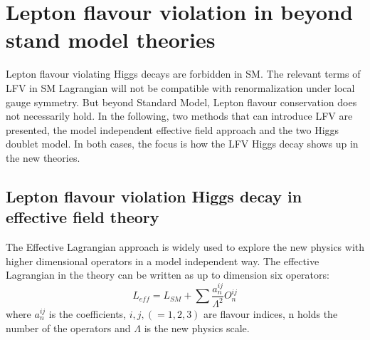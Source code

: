 \section{Lepton flavour violation in beyond stand model theories}
Lepton flavour violating Higgs decays are forbidden in SM. The relevant terms of LFV in SM Lagrangian will not be compatible with renormalization under local gauge symmetry. But beyond Standard Model, Lepton flavour conservation does not necessarily hold. In the following, two methods that can introduce LFV are presented, the model independent effective field approach and the two Higgs doublet model. In both cases, the focus is how the LFV Higgs decay shows up in the new theories. 


\subsection{Lepton flavour violation Higgs decay in effective field theory}\label{effective_field}
The Effective Lagrangian approach is widely used to explore the new physics with higher dimensional operators in a model independent way. The effective Lagrangian in the theory can be written as up to dimension six operators: 
\begin{equation}
L_{eff}=L_{SM}+\sum\frac{a^{ij}_{n}}{\Lambda^{2}}O^{ij}_{n}
\end{equation}
where $a^{ij}_{n}$ is the coefficients, $i,j,(=1,2,3)$ are flavour indices, n holds the number of the operators and $\Lambda$ is the new physics scale. 

